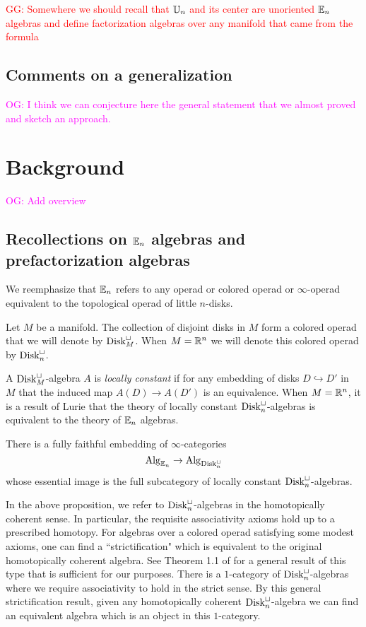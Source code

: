 \documentclass[11pt]{amsart}
\numberwithin{equation}{section}
\def\owen{\textcolor{magenta}{OG: }\textcolor{magenta}}
\def\greg{\textcolor{red}{GG: }\textcolor{red}}
\begin{document}
\greg{Somewhere we should recall that $\mathbb U_n$ and its center are unoriented $\mathbb E_n$ algebras and define factorization algebras over any manifold that came from the formula}

\subsection{Comments on a generalization}

\owen{I think we can conjecture here the general statement that we almost proved and sketch an approach.}

\section{Background}
\label{sec: background}

\owen{Add overview}

\subsection{Recollections on $\mathbb E_n$ algebras and prefactorization algebras}
\label{sec: en background}

We reemphasize that $\mathbb E_n$ refers to any operad or colored operad or $\infty$-operad equivalent to the topological operad of little $n$-disks. 

Let $M$ be a manifold. 
The collection of disjoint disks in $M$ form a colored operad that we will denote by ${\rm Disk}^\sqcup_M$. 
When $M = \mathbb R^n$ we will denote this colored operad by ${\rm Disk}^{\sqcup}_n$. 

A ${\rm Disk}^\sqcup_M$-algebra $A$ is {\em locally constant} if for any embedding of disks $D \hookrightarrow D'$ in $M$ that the induced map $A(D) \to A(D')$ is an equivalence. 
When $M = \mathbb R^n$, it is a result of Lurie that the theory of locally constant ${\rm Disk}^\sqcup_n$-algebras is equivalent to the theory of $\mathbb E_n$ algebras. 

\begin{thm}
\label{thm:lurie0} 
There is a fully faithful embedding of $\infty$-categories
\[
{\rm Alg}_{\mathbb E_n} \to {\rm Alg}_{{\rm Disk}^\sqcup_n}
\]
whose essential image is the full subcategory of locally constant ${\rm Disk}^\sqcup_n$-algebras. 
\end{thm}

In the above proposition, we refer to ${\rm Disk}^\sqcup_n$-algebras in the homotopically coherent sense. 
In particular, the requisite associativity axioms hold up to a prescribed homotopy.
For algebras over a colored operad satisfying some modest axioms, one can find a ``strictification" which is equivalent to the original homotopically coherent algebra.
See Theorem 1.1 of \cite{PavlovRectify} for a general result of this type that is sufficient for our purposes. 
There is a $1$-category of ${\rm Disk}^\sqcup_n$-algebras where we require associativity to hold in the strict sense. 
By this general strictification result, given any homotopically coherent ${\rm Disk}^{\sqcup}_n$-algebra we can find an equivalent algebra which is an object in this $1$-category. 
\end{document}

